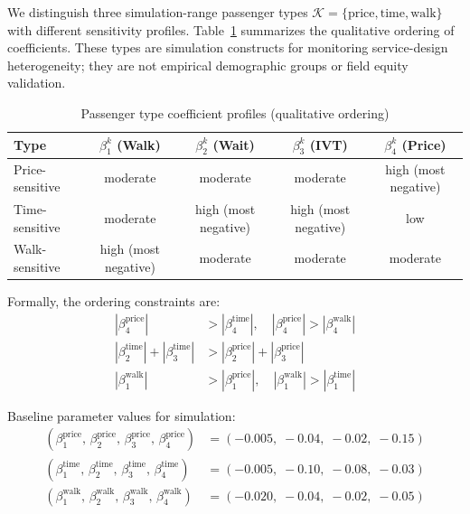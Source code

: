 We distinguish three simulation-range passenger types
$\mathcal{K} = \{\text{price}, \text{time}, \text{walk}\}$ with different sensitivity
profiles. Table~\ref{tab:passenger-types} summarizes the qualitative ordering of
coefficients. These types are simulation constructs for monitoring service-design
heterogeneity; they are not empirical demographic groups or field equity validation.

\begin{table}[width=\textwidth,pos=t]
\centering
\caption{Passenger type coefficient profiles (qualitative ordering)}
\label{tab:passenger-types}
\begin{tabular}{lcccc}
\toprule
Type & $\beta_1^k$ (Walk) & $\beta_2^k$ (Wait) & $\beta_3^k$ (IVT) & $\beta_4^k$ (Price) \\
\midrule
Price-sensitive  & moderate & moderate & moderate & high (most negative) \\
Time-sensitive   & moderate & high (most negative) & high (most negative) & low \\
Walk-sensitive   & high (most negative) & moderate & moderate & moderate \\
\bottomrule
\end{tabular}
\end{table}

Formally, the ordering constraints are:
\begin{align}
  |\beta_4^{\text{price}}| &> |\beta_4^{\text{time}}|,\quad |\beta_4^{\text{price}}| > |\beta_4^{\text{walk}}| \label{eq:type-price}\\
  |\beta_2^{\text{time}}| + |\beta_3^{\text{time}}| &> |\beta_2^{\text{price}}| + |\beta_3^{\text{price}}| \label{eq:type-time}\\
  |\beta_1^{\text{walk}}| &> |\beta_1^{\text{price}}|,\quad |\beta_1^{\text{walk}}| > |\beta_1^{\text{time}}| \label{eq:type-walk}
\end{align}

Baseline parameter values for simulation:
\begin{align}
  (\beta_1^{\text{price}},\, \beta_2^{\text{price}},\, \beta_3^{\text{price}},\, \beta_4^{\text{price}})
    &= (-0.005,\; -0.04,\; -0.02,\; -0.15) \label{eq:beta-price}\\
  (\beta_1^{\text{time}},\, \beta_2^{\text{time}},\, \beta_3^{\text{time}},\, \beta_4^{\text{time}})
    &= (-0.005,\; -0.10,\; -0.08,\; -0.03) \label{eq:beta-time}\\
  (\beta_1^{\text{walk}},\, \beta_2^{\text{walk}},\, \beta_3^{\text{walk}},\, \beta_4^{\text{walk}})
    &= (-0.020,\; -0.04,\; -0.02,\; -0.05) \label{eq:beta-walk}
\end{align}

